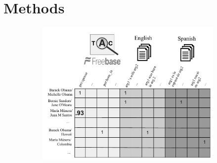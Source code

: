 \section {Methods}


\begin{figure}[h]
\caption{
Universal Schema jointly embeds KB and textual relations from Spanish and English, learning dense representations for entity pairs and relations using matrix factorization. Cells with a 1 indicate triples observed during training (left). The bold score represents a test-time prediction by the model (right). Using transitivity through KB/English overlap and English/Spanish overlap, our model can predict that a text pattern in Spanish evidences a KB relation despite no overlap between Spanish/KB entity pairs.
At train time we use BPR loss to maximize the inner product of entity pairs with KB relations and text patterns encoded using a bidirectional LSTM. At test time we score compatibility between embedded KB relations and encoded textual patterns using cosine similarity. In our Spanish model we treat embeddings for a small set of English/Spanish translation pairs as a single word, e.g. casado and married.
\label{fig:model}}
  \hspace{-.55cm}%
\begin{subfigure}{.7\textwidth}
    \includegraphics[scale=.65]{matrix}
\end{subfigure}%
  \hspace{-1.5cm}%
\begin{subfigure}{.4\textwidth}

\end{subfigure}
\end{figure}
